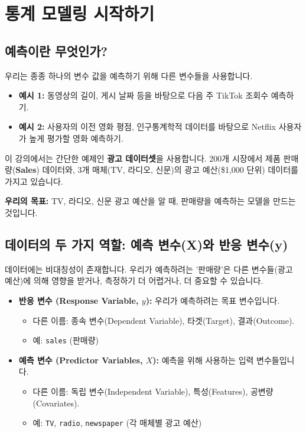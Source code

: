 \documentclass[11pt,a4paper]{book}
\theoremstyle{definition}
\begin{document}
\section{통계 모델링 시작하기}

\subsection{예측이란 무엇인가?}

우리는 종종 하나의 변수 값을 예측하기 위해 다른 변수들을 사용합니다.

\begin{itemize}
    \item \textbf{예시 1:} 동영상의 길이, 게시 날짜 등을 바탕으로 다음 주 TikTok 조회수 예측하기.
    \item \textbf{예시 2:} 사용자의 이전 영화 평점, 인구통계학적 데이터를 바탕으로 Netflix 사용자가 높게 평가할 영화 예측하기.
\end{itemize}

이 강의에서는 간단한 예제인 \textbf{광고 데이터셋}을 사용합니다. 200개 시장에서 제품 판매량(\textbf{Sales}) 데이터와, 3개 매체(TV, 라디오, 신문)의 광고 예산(\$1,000 단위) 데이터를 가지고 있습니다.

\textbf{우리의 목표:} TV, 라디오, 신문 광고 예산을 알 때, 판매량을 예측하는 모델을 만드는 것입니다.

\subsection{데이터의 두 가지 역할: 예측 변수(X)와 반응 변수(y)}

데이터에는 비대칭성이 존재합니다. 우리가 예측하려는 '판매량'은 다른 변수들(광고 예산)에 의해 영향을 받거나, 측정하기 더 어렵거나, 더 중요할 수 있습니다.

\begin{itemize}
    \item \textbf{반응 변수 (Response Variable, $y$):} 우리가 예측하려는 목표 변수입니다.
        \begin{itemize}
            \item 다른 이름: 종속 변수(Dependent Variable), 타겟(Target), 결과(Outcome).
            \item 예: \texttt{sales} (판매량)
        \end{itemize}
    \item \textbf{예측 변수 (Predictor Variables, $X$):} 예측을 위해 사용하는 입력 변수들입니다.
        \begin{itemize}
            \item 다른 이름: 독립 변수(Independent Variable), 특성(Features), 공변량(Covariates).
            \item 예: \texttt{TV}, \texttt{radio}, \texttt{newspaper} (각 매체별 광고 예산)
        \end{itemize}
\end{itemize}
\end{document}
